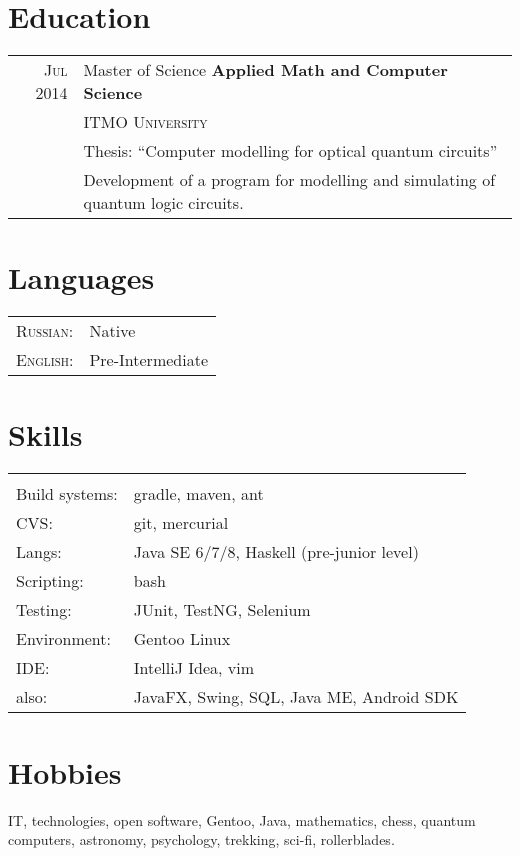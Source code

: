 \documentclass[a4paper,11pt]{article}
\begin{document}
\section{Education}
	\begin{tabular}{rl}	
	  \textsc{Jul 2014} & Master of Science \textbf{ Applied Math and Computer Science} \\& \textsc{ITMO University}\\
			& Thesis: ``Computer modelling for optical quantum circuits''\\&
			Development of a program for modelling and simulating of quantum logic circuits.
	\end{tabular}

\section{Languages}
	\begin{tabular}{ll}
		\textsc{Russian:}&Native\\
		\textsc{English:}&Pre-Intermediate\\
	\end{tabular}

\section{Skills}
	\begin{tabular}{ll}
		\multicolumn{2}{c}{} \\
			Build systems: 	& gradle, maven, ant \\
			CVS: 		& git, mercurial \\
			Langs: 		& Java SE 6/7/8, Haskell (pre-junior level)\\
			Scripting: 	& bash \\ 
			Testing: 	& JUnit, TestNG, Selenium \\
			Environment: 	& Gentoo Linux \\
			IDE: 		& IntelliJ Idea, vim \\
			also: 		& JavaFX, Swing, SQL, Java ME, Android SDK
	\end{tabular}

\section{Hobbies}
	IT, technologies, open software, Gentoo, Java, mathematics, chess, quantum computers, astronomy, 
	psychology, trekking, sci-fi, rollerblades. 
\end{document}
